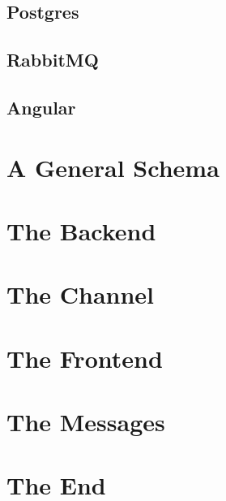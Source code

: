 \documentclass[11pt]{article}
\begin{document}
\subsection{Postgres}
\label{sec:org449c77e}

\subsection{RabbitMQ}
\label{sec:org77634ef}

\subsection{Angular}
\label{sec:org2103d73}

\section{A General Schema}
\label{sec:orgd905d87}

\section{The Backend}
\label{sec:org35dec3f}

\section{The Channel}
\label{sec:orgc21e8f0}

\section{The Frontend}
\label{sec:org42ec995}

\section{The Messages}
\label{sec:org65ad6da}

\section{The End}
\label{sec:org7ea6b72}
\end{document}
